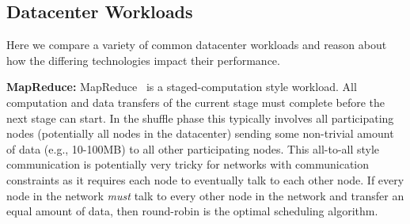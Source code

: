 


\subsection{Datacenter Workloads}
\label{sec:workloads}

Here we compare a variety of common datacenter workloads and reason about how
the differing technologies impact their performance. 

{\bf MapReduce:} MapReduce~\cite{MapReduce} is a staged-computation style
workload. All computation and data transfers of the current stage must complete
before the next stage can start. In the shuffle phase this typically involves
all participating nodes (potentially all nodes in the datacenter) sending some
non-trivial amount of data (e.g., 10-100MB) to all other participating
nodes. This all-to-all style communication is potentially very tricky for
networks with communication constraints as it requires each node to eventually
talk to each other node. If every node in the network \emph{must} talk to every
other node in the network and transfer an equal amount of data, then round-robin
is the optimal scheduling algorithm. 

